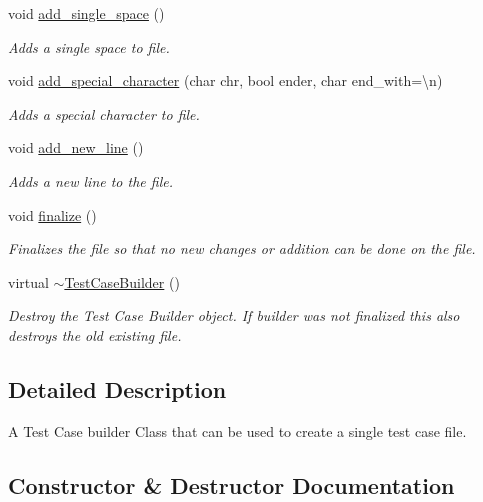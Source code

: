\begin{DoxyCompactItemize}
void \mbox{\hyperlink{classtestcaser_1_1maker_1_1TestCaseBuilder_a346353a9850fd12cc0b74f9d370d8684}{add\+\_\+single\+\_\+space}} ()
\begin{DoxyCompactList}\small\item\em Adds a single space to file. \end{DoxyCompactList}\item 
void \mbox{\hyperlink{classtestcaser_1_1maker_1_1TestCaseBuilder_a4c15102b9a5d105f9824fe6007a4b380}{add\+\_\+special\+\_\+character}} (char chr, bool ender, char end\+\_\+with=\textquotesingle{}\textbackslash{}n\textquotesingle{})
\begin{DoxyCompactList}\small\item\em Adds a special character to file. \end{DoxyCompactList}\item 
void \mbox{\hyperlink{classtestcaser_1_1maker_1_1TestCaseBuilder_afe89adc38ccc15a5a11a68f133f0b664}{add\+\_\+new\+\_\+line}} ()
\begin{DoxyCompactList}\small\item\em Adds a new line to the file. \end{DoxyCompactList}\item 
void \mbox{\hyperlink{classtestcaser_1_1maker_1_1TestCaseBuilder_a235c9c4e34fe708831cf300f812fbaed}{finalize}} ()
\begin{DoxyCompactList}\small\item\em Finalizes the file so that no new changes or addition can be done on the file. \end{DoxyCompactList}\item 
virtual \mbox{\hyperlink{classtestcaser_1_1maker_1_1TestCaseBuilder_ad463fd2e4c6175c15c310c4af66ec344}{$\sim$\+Test\+Case\+Builder}} ()
\begin{DoxyCompactList}\small\item\em Destroy the Test Case Builder object. If builder was not finalized this also destroys the old existing file. \end{DoxyCompactList}\end{DoxyCompactItemize}


\subsection{Detailed Description}
A Test Case builder Class that can be used to create a single test case file. 



\subsection{Constructor \& Destructor Documentation}
\mbox{\label{classtestcaser_1_1maker_1_1TestCaseBuilder_a1faa00929cc5be8c8bbb312541858e61}} 
